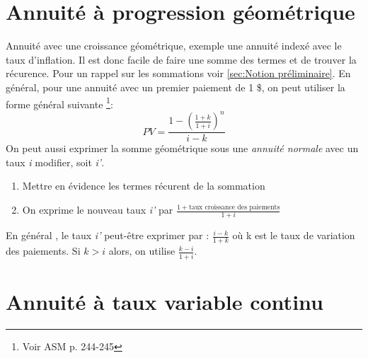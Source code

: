 \documentclass[11pt,french]{report}
\begin{document}
\section{Annuité à progression géométrique}
\label{annuité géométrique}

Annuité avec une croissance géométrique, exemple une annuité indexé avec le taux d'inflation. Il est donc facile de faire une somme des termes et de trouver la récurence. Pour un rappel sur les sommations voir \ref{sec:Notion préliminaire}.
En général, pour une annuité avec un premier paiement de 1 \$, on peut utiliser la forme général suivante \footnote{Voir ASM p. 244-245}:
\begin{equation}
PV = \frac{1 - (\frac{1+k}{1+i})^n}{i-k}
\end{equation}
On peut aussi exprimer la somme géométrique sous une \emph{annuité normale} avec un taux \textit{i} modifier, soit \textit{i'}.
\begin{enumerate}
\item Mettre en évidence les termes récurent de la sommation
\item On exprime le nouveau taux \emph{i'} par $\frac{1 + \text{taux croissance des paiements}}{1+i}$
\end{enumerate}
En général , le taux \emph{i'} peut-être exprimer par : $\frac{i - k}{1+k}$ où k est le taux de variation des paiements. Si $k>i$ alors, on utilise $\frac{k-i}{1+i}$.

\section{Annuité à taux variable continu}
\label{sec:taux variable continu}
\end{document}
